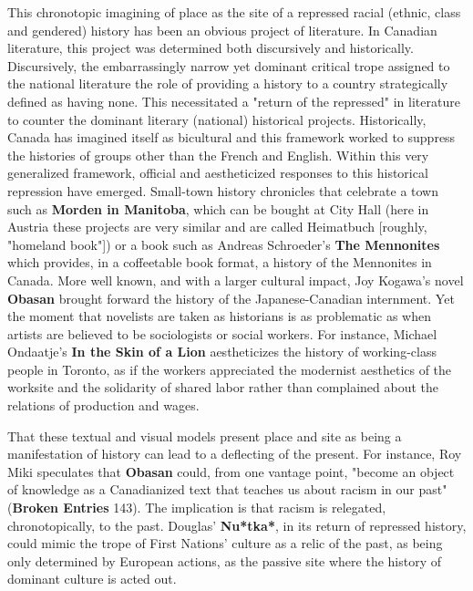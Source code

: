 This chronotopic imagining of place as the site of a repressed racial
(ethnic, class and gendered) history has been an obvious project of
literature. In Canadian literature, this project was determined both
discursively and historically. Discursively, the embarrassingly narrow
yet dominant critical trope assigned to the national literature the role
of providing a history to a country strategically defined as having
none. This necessitated a "return of the repressed" in literature to
counter the dominant literary (national) historical projects.
Historically, Canada has imagined itself as bicultural and this
framework worked to suppress the histories of groups other than the
French and English. Within this very generalized framework, official and
aestheticized responses to this historical repression have emerged.
Small-town history chronicles that celebrate a town such as
\textbf{Morden in Manitoba}, which can be bought at City Hall (here in
Austria these projects are very similar and are called Heimatbuch
{[}roughly, "homeland book"{]}) or a book such as Andreas Schroeder's
\textbf{The Mennonites} which provides, in a coffeetable book format, a
history of the Mennonites in Canada. More well known, and with a larger
cultural impact, Joy Kogawa's novel \textbf{Obasan} brought forward the
history of the Japanese-Canadian internment. Yet the moment that
novelists are taken as historians is as problematic as when artists are
believed to be sociologists or social workers. For instance, Michael
Ondaatje's \textbf{In the Skin of a Lion} aestheticizes the history of
working-class people in Toronto, as if the workers appreciated the
modernist aesthetics of the worksite and the solidarity of shared labor
rather than complained about the relations of production and wages.

That these textual and visual models present place and site as being a
manifestation of history can lead to a deflecting of the present. For
instance, Roy Miki speculates that \textbf{Obasan} could, from one
vantage point, "become an object of knowledge as a Canadianized text
that teaches us about racism in our past" (\textbf{Broken Entries} 143).
The implication is that racism is relegated, chronotopically, to the
past. Douglas' \textbf{Nu*tka*}, in its return of repressed history,
could mimic the trope of First Nations' culture as a relic of the past,
as being only determined by European actions, as the passive site where
the history of dominant culture is acted out.

